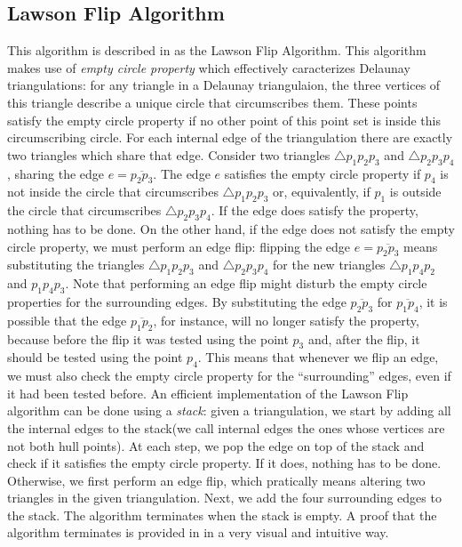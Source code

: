 \documentclass[a4paper, 10pt, conference]{ieeeconf}      %
\begin{document}
\subsection{Lawson Flip Algorithm}
This algorithm is described in \cite{cg13} as the Lawson Flip Algorithm.
This algorithm makes use of \textit{empty circle property} \cite{dcg, cg13} which effectively caracterizes Delaunay triangulations: for any triangle in a Delaunay triangulaion, the three vertices of this triangle describe a unique circle that circumscribes them. 
These points satisfy the empty circle property if no other point of this point set is inside this circumscribing circle.
For each internal edge of the triangulation there are exactly two triangles which share that edge.
Consider two triangles $\triangle p_1p_2p_3$ and $\triangle p_2p_3p_4$, sharing the edge $e = \overline{p_{2}p_{3}}$.
The edge $e$ satisfies the empty circle property if $p_4$ is not inside the circle that circumscribes $\triangle p_1p_2p_3$ or, equivalently, if $p_1$ is outside the circle that circumscribes $\triangle p_2p_3p_4$.
If the edge does satisfy the property, nothing has to be done.
On the other hand, if the edge does not satisfy the empty circle property, we must perform an edge flip: flipping the edge $e = \overline{p_{2}p_{3}}$ means substituting the triangles $\triangle p_1p_2p_3$ and $\triangle p_2p_3p_4$ for the new triangles $\triangle p_1p_4p_2$ and $p_1p_4p_3$.
Note that performing an edge flip might disturb the empty circle properties for the surrounding edges.
By substituting the edge $\overline{p_{2}p_{3}}$ for $\overline{p_{1}p_{4}}$, it is possible that the edge $\overline{p_1p_2}$, for instance, will no longer satisfy the property, because before the flip it was tested using the point $p_3$ and, after the flip, it should be tested using the point $p_4$.
This means that whenever we flip an edge, we must also check the empty circle property for the ``surrounding'' edges, even if it had been tested before.
An efficient implementation of the Lawson Flip algorithm can be done using a \textit{stack}: given a triangulation, we start by adding all the internal edges to the stack(we call internal edges the ones whose vertices are not both hull points). 
At each step, we pop the edge on top of the stack and check if it satisfies the empty circle property.
If it does, nothing has to be done.
Otherwise, we first perform an edge flip, which pratically means altering two triangles in the given triangulation.
Next, we add the four surrounding edges to the stack.
The algorithm terminates when the stack is empty.
A proof that the algorithm terminates is provided in \cite{cg13} in a very visual and intuitive way.
\end{document}
